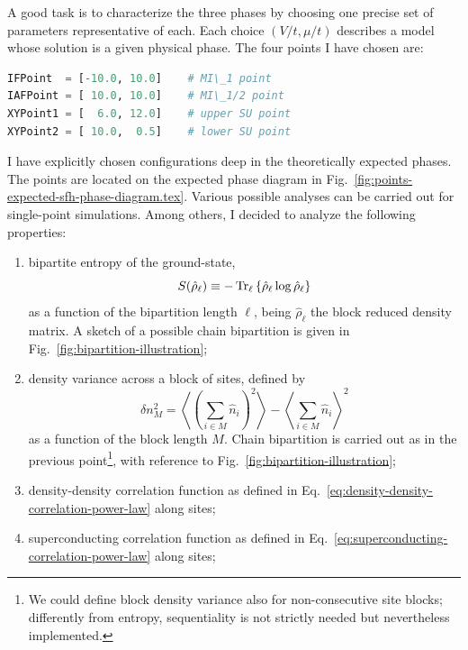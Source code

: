 A good task is to characterize the three phases by choosing one precise set of parameters representative of each. Each choice $(V/t,\mu/t)$ describes a model whose solution is a given physical phase. The four points I have chosen are:
\begin{lstlisting}[language=julia]
IFPoint  = [-10.0, 10.0]	# MI\_1 point
IAFPoint = [ 10.0, 10.0]	# MI\_1/2 point
XYPoint1 = [  6.0, 12.0]	# upper SU point
XYPoint2 = [ 10.0,  0.5]	# lower SU point
\end{lstlisting}
I have explicitly chosen configurations deep in the theoretically expected phases. The points are located on the expected phase diagram in Fig.~\ref{fig:points-expected-sfh-phase-diagram.tex}. Various possible analyses can be carried out for single-point simulations. Among others, I decided to analyze the following properties:
\begin{enumerate}
	\item bipartite entropy of the ground-state,
	\begin{equation}\label{eq:bipartite-entropy-definition}
		S(\hat \rho_\ell) \equiv - \Tr_\ell \left\lbrace \hat \rho_\ell \log \hat \rho_\ell \right\rbrace
	\end{equation}
	as a function of the bipartition length $\ell$, being $\hat \rho_\ell$ the block reduced density matrix. A sketch of a possible chain bipartition is given in Fig.~\ref{fig:bipartition-illustration};
	\item density variance across a block of sites, defined by
	\begin{equation}\label{eq:density-block-variance-definition}
		\delta n_M^2 = \left\langle \left( \sum_{i \in M} \hat n_i \right)^2 \right\rangle - \left\langle \sum_{i \in M} \hat n_i \right\rangle^2
	\end{equation}
	as a function of the block length $M$. Chain bipartition is carried out as in the previous point\footnote{
		We could define block density variance also for non-consecutive site blocks; differently from entropy, sequentiality is not strictly needed but nevertheless implemented.
	}, with reference to Fig.~\ref{fig:bipartition-illustration};
	\item density-density correlation function as defined in Eq.~\eqref{eq:density-density-correlation-power-law} along sites;
	\item superconducting correlation function as defined in Eq.~\eqref{eq:superconducting-correlation-power-law} along sites;
\end{enumerate}

